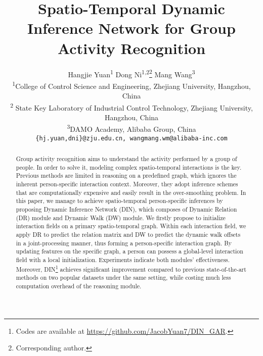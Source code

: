 \documentclass[10pt,twocolumn,letterpaper]{article}
\begin{document}
\title{Spatio-Temporal Dynamic Inference Network for Group Activity Recognition}
\author{Hangjie Yuan\textsuperscript{\rm 1} \quad Dong Ni\textsuperscript{\rm 1,2}\thanks{Corresponding author.} \quad Mang Wang\textsuperscript{\rm 3} \\

\textsuperscript{\rm 1}College of Control Science and Engineering, Zhejiang University, Hangzhou, China \\ 
\textsuperscript{\rm 2} State Key Laboratory of Industrial Control Technology, Zhejiang University, Hangzhou, China \\
\textsuperscript{\rm 3}DAMO Academy, Alibaba Group, China\\
\tt\small \{hj.yuan,dni\}@zju.edu.cn, wangmang.wm@alibaba-inc.com\\
}












\maketitle
\ificcvfinal\thispagestyle{empty}\fi

\begin{abstract}
    Group activity recognition aims to understand the activity performed by a group of people. In order to solve it, modeling complex spatio-temporal interactions is the key. Previous methods are limited in reasoning on a predefined graph, which ignores the inherent person-specific interaction context. Moreover, they adopt inference schemes that are computationally expensive and easily result in the over-smoothing problem. In this paper, we manage to achieve spatio-temporal person-specific inferences by proposing Dynamic Inference Network (DIN), which composes of Dynamic Relation (DR) module and Dynamic Walk (DW) module. We firstly propose to initialize interaction fields on a primary spatio-temporal graph. Within each interaction field, we apply DR to predict the relation matrix and DW to predict the dynamic walk offsets in a joint-processing manner, thus forming a person-specific interaction graph. By updating features on the specific graph, a person can possess a global-level interaction field with a local initialization. Experiments indicate both modules' effectiveness. Moreover, DIN\footnote{Codes are available at \url{https://github.com/JacobYuan7/DIN_GAR}.} achieves significant improvement compared to previous state-of-the-art methods on two popular datasets under the same setting, while costing much less computation overhead of the reasoning module. 
\end{abstract}
\end{document}
